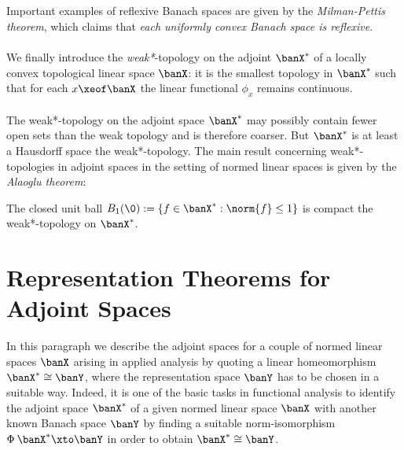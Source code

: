 \documentclass[11pt,twoside]{article}
\begin{document}
\subparagraph{} %
Important examples of reflexive Banach spaces are given
by the \textit{Milman-Pettis} \textit{theorem},
which claims that
\textit{each uniformly convex Banach space is reflexive}.

\paragraph{} %
We finally introduce the \textit{weak*}-topology on the adjoint $\banX^*$
of a locally convex topological linear space $\banX$:
it is the smallest topology in $\banX^*$
such that
for each $x \xeof \banX$ the linear functional $\phi_x$ remains continuous.

\paragraph{} %
The weak*-topology on the adjoint space $\banX^*$ may possibly contain
fewer open sets than the weak topology and is therefore coarser.
But $\banX^*$ is at least a Hausdorff space {\wrt} the weak*-topology.
The main result concerning weak*-topologies in adjoint spaces in the setting
of normed linear spaces is given by the \textit{Alaoglu theorem}:

\begin{theorem1}\label{III_ALAOGLU_BOURBAKI_THEOREM}
The closed unit ball
$B_1(\0) : = \{ f \in \banX^*: \norm{f} \leq 1 \}$ is compact
{\wrt} the weak*-topology on $\banX^*$.
\end{theorem1}

\section{Representation Theorems for Adjoint Spaces}
In this paragraph we describe the adjoint spaces
for a couple of normed linear spaces $\banX$ arising in applied analysis
by quoting a linear homeomorphism $\banX^* \cong \banY$,
where the representation space $\banY$ has to be chosen in a suitable way.
Indeed,
it is one of the basic tasks in functional analysis to identify
the adjoint space $\banX^*$ of a given normed linear space $\banX$
with another known Banach space $\banY$
by finding a suitable norm-isomorphism $\Phi \: \banX^* \xto \banY$
in order to obtain $\banX^* \cong \banY$.
\end{document}

